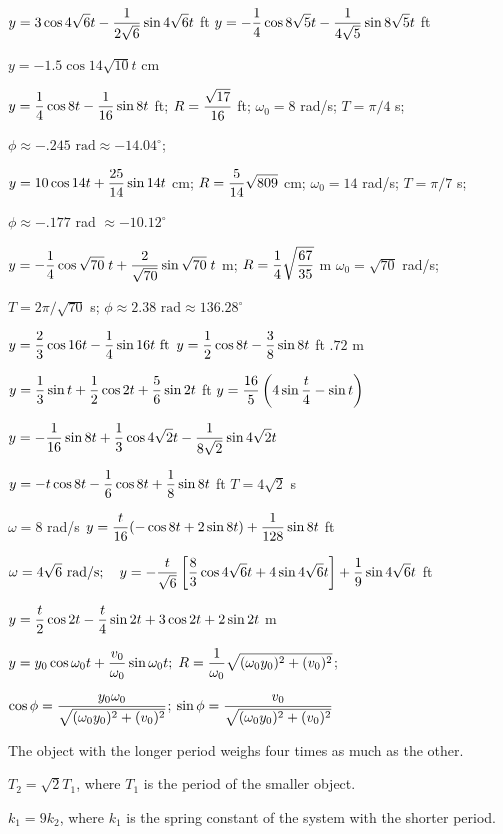 \medskip

   $y=\displaystyle{3\cos4\sqrt{6}t-\frac{1}{2\sqrt{6}}\sin4\sqrt{6}t}$ ft
  $y=\displaystyle{-\frac{1}{4}\cos8\sqrt{5}t-\frac{1}{4\sqrt{5}}\sin8\sqrt{5}t}$ ft

  $y=-1.5\cos14\sqrt{10}t$ cm

$y=\displaystyle{\frac{1}{4}\cos8t-\frac{1}{16}\sin8t}$ ft;\;
$R=\displaystyle\frac{\sqrt{17}}{16}$ ft;\; $\omega_{0}=8$ rad/s;\; $T=\pi/4$ s;

\quad\;  \;    $\phi\approx-.245\mbox{ rad}\approx-14.04^{\circ}$;

$y=\displaystyle{10\cos14t+\frac{25}{14}\sin14t}$ cm;\;
$R=\displaystyle\frac{5}{14}\sqrt{809}$ cm;\; $\omega_{0}=14$ rad/s;
 $T=\pi/7$ s;\;

\quad\;  \;  $\phi\approx-.177$ rad $\approx -10.12^{\circ}$

$y=\displaystyle{-\frac{1}{4}\cos\sqrt{70}\;t+\frac{2}{\sqrt{70}}\sin\sqrt{70}\;t}$ m;\; $R=\displaystyle{\frac{1}{4}\sqrt{\frac{67}{35}}}$ m\; $\omega_{0}=\sqrt{70}$ rad/s;

\quad\;  \;   $T=2\pi/\sqrt{70}$ s;\;
$\phi\approx2.38\mbox{ rad}\approx136.28^{\circ}$

 $y=\displaystyle{\frac{2}{3}\cos16t-\frac{1}{4}\sin16t\mbox{ ft}}$
 $y=\displaystyle{\frac{1}{2}\cos8t-\frac{3}{8}\sin8t}$ ft
  $.72\mbox{ m}$

  $y=\displaystyle{\frac{1}{3}\sin t+\frac{1}{2}\cos2t+\frac{5}{6}\sin2t}$ ft
$y=\displaystyle{\frac{16}{5}\left(4\sin\frac{t}{4}-\sin t\right)}$

 $y=\displaystyle{-\frac{1}{16}\sin8t+\frac{1}{3}\cos4\sqrt{2}t-\frac{1}{8\sqrt{2}}\sin4\sqrt{2}t}$

 $y=\displaystyle{-t\cos8t-\frac{1}{6}\cos8t+\frac{1}{8}\sin8t}$ ft
  $T=4\sqrt{2}$ s

 $\omega=8$ rad/s
$y=\displaystyle{\frac{t}{16}(-\cos8t+2\sin8t)+\frac{1}{128}\sin8t}$ ft

 $\displaystyle{\omega=4\sqrt{6}\mbox{ rad/s};\quad y=-\frac{t}{\sqrt{6}}\left[\frac{8}{3}\cos4\sqrt{6}t+4\sin
4\sqrt{6}t\right]+\frac{1}{9}\sin4\sqrt{6}t}$ ft

 $y=\displaystyle{\frac{t}{2}\cos2t-\frac{t}{4}\sin2t+3\cos2t+2\sin2t}$ m

$y=\displaystyle{y_{0}\cos\omega_{0}t+\frac{v_{0}}{\omega_{0}}\sin\omega_{0}t;\;
R=\frac{1}{\omega_{0}}\sqrt{(\omega_{0}y_{0})^{2}+(v_{0})^{2}}}$;\;

\quad\;  \;  $\cos\phi=\displaystyle\frac{y_{0}\omega_{0}}{\sqrt{(\omega_{0}y_{0})^{2}+(v_{0})^{2}}}$;\; $\sin\phi=\displaystyle\frac{v_{0}}{\sqrt{(\omega_{0}y_{0})^{2}+(v_{0})^{2}}}$

  The object with the longer period weighs four times as much as
the other.

  $T_{2}=\sqrt{2}T_{1}$, where $T_{1}$ is the period of the smaller
object.

  $k_{1}=9k_{2}$, where $k_{1}$ is the spring constant of the
system with the shorter period.

